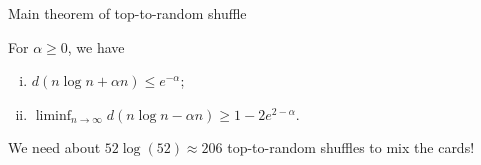 \documentclass[10pt]{beamer}
\begin{document}
\begin{frame}[label=mainthm]{Main theorem of top-to-random shuffle}
    \begin{theorem}
    For $\alpha \geq 0$, we have 
        \begin{enumerate}[(i)]
            \item $d(n\log n+ \alpha n) \leq e^{-\alpha}$;
            \item %
            $\liminf_{n\to\infty} d(n\log n - \alpha n) \geq 1 - 2 e^{2-\alpha}$.
        \end{enumerate}
    \end{theorem}
    We need about $52\log(52) \approx 206$ top-to-random shuffles to mix the cards!
\end{frame}
\end{document}
